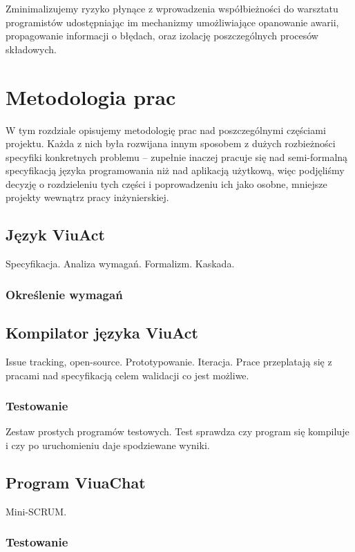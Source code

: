 \documentclass[11pt,oneside,a4paper,titlepage,onecolumn]{book}
\begin{document}
Zminimalizujemy ryzyko płynące z wprowadzenia współbieżności do warsztatu programistów udostępniając im
mechanizmy umożliwiające opanowanie awarii, propagowanie informacji o błędach, oraz izolację poszczególnych
procesów składowych.

\chapter{Metodologia prac}

W tym rozdziale opisujemy metodologię prac nad poszczególnymi częściami projektu. Każda z nich była rozwijana
innym sposobem z dużych rozbieżności specyfiki konkretnych problemu -- zupełnie inaczej pracuje się nad
semi-formalną specyfikacją języka programowania niż nad aplikacją użytkową, więc podjęliśmy decyzję o
rozdzieleniu tych części i poprowadzeniu ich jako osobne, mniejsze projekty wewnątrz pracy inżynierskiej.

\section{Język ViuAct}

Specyfikacja. Analiza wymagań. Formalizm. Kaskada.

\subsection{Określenie wymagań}

\section{Kompilator języka ViuAct}

Issue tracking, open-source. Prototypowanie. Iteracja.
Prace przeplatają się z pracami nad specyfikacją celem walidacji co jest możliwe.

\subsection{Testowanie}

Zestaw prostych programów testowych. Test sprawdza czy program się kompiluje i czy po uruchomieniu daje
spodziewane wyniki.

\section{Program ViuaChat}

Mini-SCRUM.

\subsection{Testowanie}
\end{document}

